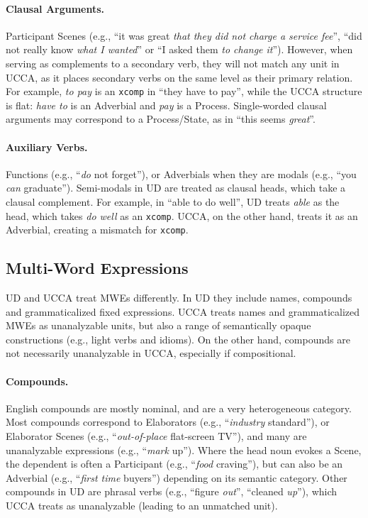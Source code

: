 \documentclass[11pt,a4paper]{article}
\begin{document}
\paragraph{Clausal Arguments.}
    Participant Scenes
    (e.g., ``it was great \textit{that they did not charge a service fee}'',
    ``did not really know \textit{what I wanted}'' or
    ``I asked them \textit{to change it}'').
    However, when serving as complements to a secondary verb, they
    will not match any unit in UCCA, as it places secondary verbs on the 
    same level as their primary relation. 
    For example, \textit{to pay} is an \texttt{xcomp} in ``they have to pay'', while
    the UCCA structure is flat: \textit{have to} is an Adverbial and \textit{pay} is a Process.
    Single-worded clausal arguments may correspond to a Process/State,
    as in ``this seems \textit{great}''.

\paragraph{Auxiliary Verbs.} Functions (e.g., ``\textit{do} not forget''),
    or Adverbials when they are modals (e.g., ``you \textit{can} graduate''). Semi-modals 
    in UD are treated as clausal heads, which take a clausal complement. 
    For example, in ``able to do well'', UD treats \textit{able} as the head,
    which takes \textit{do well} as an \texttt{xcomp}. UCCA, on the other hand,
    treats it as an Adverbial, creating a mismatch for \texttt{xcomp}.
    

\subsection{Multi-Word Expressions}\label{sec:mwe}

UD and UCCA treat MWEs differently.
In UD they include names, compounds and grammaticalized fixed expressions.
UCCA treats names and grammaticalized MWEs as unanalyzable units,
but also a range of semantically opaque constructions
(e.g., light verbs and idioms).
On the other hand, compounds are not necessarily unanalyzable in UCCA,
especially if compositional.

\paragraph{Compounds.} English compounds are mostly nominal,
        and are a very heterogeneous category.
        Most compounds correspond to Elaborators (e.g., ``\textit{industry} standard''),
        or Elaborator Scenes (e.g., ``\textit{out-of-place} flat-screen TV''),
        and many are unanalyzable expressions (e.g., ``\textit{mark} up'').
        Where the head noun evokes a Scene, the dependent is often a Participant
        (e.g., ``\textit{food} craving''), but can also be an Adverbial 
        (e.g., ``\textit{first time} buyers'') depending on its semantic category.
        Other compounds in UD are phrasal verbs (e.g., ``figure \textit{out}'', ``cleaned \textit{up}''),
        which UCCA treats as unanalyzable (leading to an unmatched unit). 
            
\end{document}
